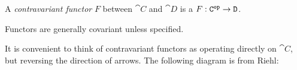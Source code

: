 


\begin{dfn*}
	A \emph{contravariant functor} $F$ between
	 $\cat{C}$ and $\cat{D}$ is a  $F:
		{{{\normalfont\texttt{C}}}^{{\normalfont\texttt{op}}}}\rightarrow{\normalfont\texttt{D}}$.
\end{dfn*}

Functors are generally covariant unless specified.

It is convenient to think of contravariant functors as operating directly on
$\cat{C}$, but reversing the direction of arrows. The following diagram is from
Riehl:

\begin{figure}[H]
	\centering
\end{figure}



